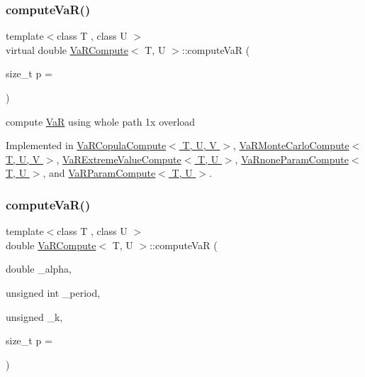 \subsubsection{\texorpdfstring{compute\+Va\+R()}{computeVaR()}\hspace{0.1cm}{\footnotesize\ttfamily [1/2]}}
{\footnotesize\ttfamily template$<$class T , class U $>$ \\
virtual double \hyperlink{classVaRCompute}{Va\+R\+Compute}$<$ T, U $>$\+::compute\+VaR (\begin{DoxyParamCaption}\item[{size\+\_\+t}]{p = {} }\end{DoxyParamCaption})\hspace{0.3cm}{\ttfamily [pure virtual]}}



compute \hyperlink{classVaR}{VaR} using whole path 1x overload 



Implemented in \hyperlink{classVaRCopulaCompute_a5f2a4f1eab16cd600683309d49800e89}{Va\+R\+Copula\+Compute$<$ T, U, V $>$}, \hyperlink{classVaRMonteCarloCompute_a43b5493187d834fa2ba1bdb53c353947}{Va\+R\+Monte\+Carlo\+Compute$<$ T, U, V $>$}, \hyperlink{classVaRExtremeValueCompute_aa0a5cedce7a1a0dc0298f5b59add0e2c}{Va\+R\+Extreme\+Value\+Compute$<$ T, U $>$}, \hyperlink{classVaRnoneParamCompute_a171ea43cd1a1a9a38cf415c22e06898a}{Va\+Rnone\+Param\+Compute$<$ T, U $>$}, and \hyperlink{classVaRParamCompute_a0dcd8d0204328a73526aeb3859b3e159}{Va\+R\+Param\+Compute$<$ T, U $>$}.

\hypertarget{classVaRCompute_a26618931d3370340944295ae5d882db5}{}\label{classVaRCompute_a26618931d3370340944295ae5d882db5} 
\subsubsection{\texorpdfstring{compute\+Va\+R()}{computeVaR()}\hspace{0.1cm}{\footnotesize\ttfamily [2/2]}}
{\footnotesize\ttfamily template$<$class T , class U $>$ \\
double \hyperlink{classVaRCompute}{Va\+R\+Compute}$<$ T, U $>$\+::compute\+VaR (\begin{DoxyParamCaption}\item[{double}]{\+\_\+alpha,  }\item[{unsigned int}]{\+\_\+period,  }\item[{unsigned}]{\+\_\+k,  }\item[{size\+\_\+t}]{p = {} }\end{DoxyParamCaption})\hspace{0.3cm}{\ttfamily [inline]}}

